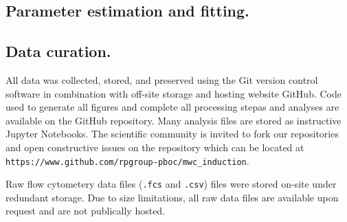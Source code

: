 \subsection{Parameter estimation and fitting.}

\subsection{Data curation.}
All data was collected, stored, and preserved using the Git version control
software in combination with off-site storage and hosting website GitHub. Code
used to generate all figures and complete all processing stepas and analyses
are available on the GitHub repository. Many analysis files are stored as
instructive Jupyter Notebooks. The scientific community is invited to fork our
repositories and open constructive issues on the repository which can be
located at \texttt{https://www.github.com/rpgroup-pboc/mwc_induction}.

Raw flow cytometery data files (\texttt{.fcs} and \texttt{.csv}) files were
stored on-site under redundant storage. Due to size limitations, all raw data
files are available upon request and are not publically hosted.
